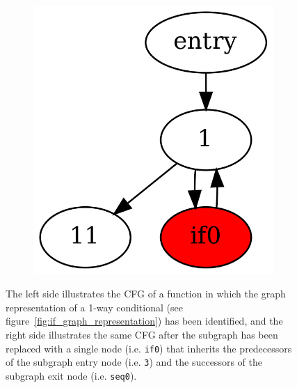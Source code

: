 \begin{figure}[htbp]
\begin{subfigure}[ht]{0.17\textwidth}
	\end{subfigure}
	\qquad
	\begin{subfigure}[ht]{0.17\textwidth}
		\includegraphics[width=\textwidth]{inc/3_background/cfg_post_merge.png}
	\end{subfigure}
	\caption{The left side illustrates the CFG of a function in which the graph representation of a 1-way conditional (see figure~\ref{fig:if_graph_representation}) has been identified, and the right side illustrates the same CFG after the subgraph has been replaced with a single node (i.e. \texttt{if0}) that inherits the predecessors of the subgraph entry node (i.e. \texttt{3}) and the successors of the subgraph exit node (i.e. \texttt{seq0}).}
	\label{fig:subgraph_merge}
\end{figure}

